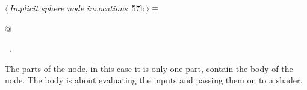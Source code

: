 \documentclass[
    a4paper,      %
    10pt,         %
    openright,    %
    notitlepage,  %
    parskip=half, %
]{scrreprt}       %
\theoremstyle{definition}                    %
\begin{document}
\begin{flushleft} \small
\begin{minipage}{\linewidth}\label{scrap94}\raggedright\small
{} $\langle\,${\itshape Implicit sphere node invocations}\nobreak\ {\footnotesize {57b}}$\,\rangle\equiv$
\vspace{-1exm}
\begin{list}{}{} \item
\mbox{}@{\NWsep}
\end{list}
\vspace{-1.5ex}
\footnotesize
\begin{list}{}{\setlength{\itemsep}{-\parsep}\setlength{\itemindent}{-\leftmargin}}
\item \NWtxtMacroRefIn\ .

\item{}
\end{list}
\end{minipage}\vspace{4ex}
\end{flushleft}
The parts of the node, in this case it is only one part, contain the body of
the node. The body is about evaluating the inputs and passing them on to a
shader.
\end{document}
